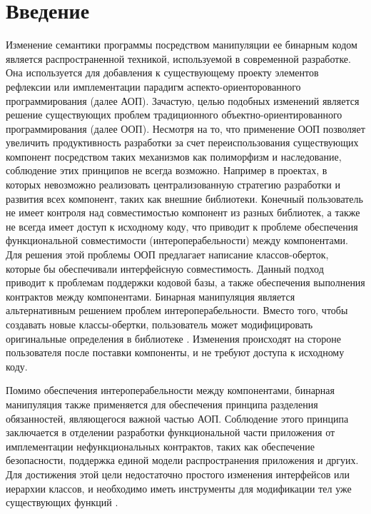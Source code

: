 \section{Введение}
\label{sec:Chapter0} 

\sloppy

Изменение семантики программы посредством манипуляции ее бинарным кодом является распространенной техникой, используемой в современной разработке. Она используется для добавления к существующему проекту элементов рефлексии или имплементации парадигм аспекто-ориенторованного программирования (далее АОП). Зачастую, целью подобных изменений является решение существующих проблем традиционного объектно-ориентированного программирования (далее ООП). Несмотря на то, что применение ООП позволяет увеличить продуктивность разработки за счет переиспользования существующих компонент посредством таких механизмов как полиморфизм и наследование, соблюдение этих принципов не всегда возможно. Например в проектах, в которых невозможно реализовать централизованную стратегию разработки и развития всех компонент, таких как внешние библиотеки. Конечный пользователь не имеет контроля над совместимостью компонент из разных библиотек, а также не всегда имеет доступ к исходному коду, что приводит к проблеме обеспечения функциональной совместимости (интероперабельности) между компонентами. Для решения этой проблемы ООП предлагает написание классов-оберток, которые бы обеспечивали интерфейсную совместимость. Данный подход приводит к проблемам поддержки кодовой базы, а также обеспечения выполнения контрактов между компонентами. Бинарная манипуляция является альтернативным решением проблем интероперабельности. Вместо того, чтобы создавать новые классы-обертки, пользователь может модифицировать оригинальные определения в библиотеке \cite{bca}. Изменения происходят на стороне пользователя после поставки компоненты, и не требуют доступа к исходному коду.

Помимо обеспечения интероперабельности между компонентами, бинарная манипуляция также применяется для обеспечения принципа разделения обязанностей, являющегося важной частью АОП. Соблюдение этого принципа заключается в отделении разработки функциональной части приложения от имплементации нефункциональных контрактов, таких как обеспечение безопасности, поддержка единой модели распространения приложения и дргуих. Для достижения этой цели недостаточно простого изменения интерфейсов или иерархии классов, и необходимо иметь инструменты для модификации тел уже существующих функций \cite{tanter2002}.

